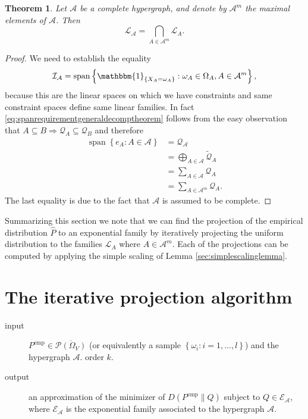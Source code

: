 \documentclass[12pt]{amsart}
\newcommand{\set}[1]{\left\lbrace #1 \right\rbrace} %
\renewcommand{\subset}{\subseteq}  %
\DeclareMathOperator*{\spann}{span}
\newcommand{\Ind}[1]{\mathbbm{1}_{\lbrace #1 \rbrace}} %
\theoremstyle{plain}%
\newtheorem{thm}{Theorem}
\theoremstyle{definition}
\theoremstyle{remark}
\begin{document}
\begin{thm}
  Let $\mathcal{A}$ be a complete hypergraph, and denote by
  $\mathcal{A}^m$ the maximal elements of $\mathcal{A}$. Then
  \begin{equation*}
    \label{eq:generaldecompositionoflinearfam}
    \mathcal{L}_\mathcal{A} = \bigcap_{A\in\mathcal{A}^m} \mathcal{L}_A.
  \end{equation*}
\end{thm}
\begin{proof} We need to establish the equality
  \begin{equation}
    \label{eq:spanrequirementgeneraldecomptheorem}
    \mathcal{I}_{\mathcal{A}} = 
    \spann\set{{\Ind{X_A=\omega_A}: \omega_A \in \Omega_A, A\in\mathcal{A}^m}},
  \end{equation}
  because this are the linear spaces on which we have constraints and
  same constraint spaces define same linear families. In fact
  \eqref{eq:spanrequirementgeneraldecomptheorem} follows from the easy
  observation that $A\subset B \Rightarrow \mathcal{Q}_A \subset
  \mathcal{Q}_B$ and therefore
  \begin{align*}
    \label{eq:reintegrationofinteractionspaces}
    \spann\set{{e_A : A \in \mathcal{A} }} & = \mathcal{Q}_\mathcal{A} \\
    & = \bigoplus_{A \in \mathcal{A}}\tilde{\mathcal{Q}}_A \\
    & = \sum_{A\in\mathcal{A}} \mathcal{Q}_A \\
    & = \sum_{A\in\mathcal{A}^m} \mathcal{Q}_A.
  \end{align*}
  The last equality is due to the fact that $\mathcal{A}$ is assumed
  to be complete. 
\end{proof}

Summarizing this section we note that we can find the projection of
the empirical distribution $\hat{P}$ to an exponential family by
iteratively projecting the uniform distribution to the families
$\mathcal{L}_A$ where $A\in\mathcal{A}^m$. Each of the projections can
be computed by applying the simple scaling of Lemma
\ref{sec:simplescalinglemma}.

\section{The iterative projection algorithm}
\label{sec:iterative projection algorithm}
\begin{description}
\item[input] $P^{\text{emp}} \in \overline{\mathcal{P}(\Omega_V)}$ (or
  equivalently a sample $\set{\omega_i : i = 1,\ldots,l}$) and the hypergraph
  $\mathcal{A}$. 
  order $k$.
\item[output] an approximation of the minimizer of
  $D(P^{\text{emp}}\parallel Q)$ subject to $Q\in \mathcal{E}_\mathcal{A}$,
  where $\mathcal{E}_\mathcal{A}$ is the exponential family associated to the
  hypergraph $\mathcal{A}$.
\end{description}
\end{document}
